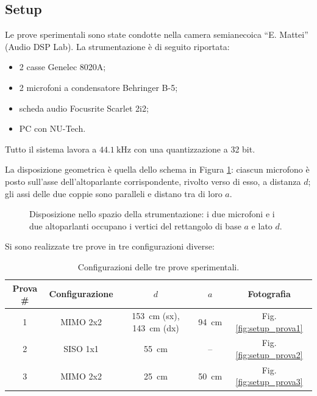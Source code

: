 \documentclass[11pt,a4paper]{article}
\begin{document}
	\subsection{Setup}
	Le prove sperimentali sono state condotte nella camera semianecoica “E. Mattei” (Audio DSP Lab). 
	La strumentazione è di seguito riportata:
	\begin{itemize}
		\item 2 casse Genelec 8020A;
		\item  2 microfoni a condensatore Behringer B-5;
		\item scheda audio Focusrite Scarlet 2i2;
		\item PC con NU-Tech.
	\end{itemize}
	
	Tutto il sistema lavora a $\SI{44.1}{\kilo\hertz}$ con una quantizzazione a 32 bit.
	
	La disposizione geometrica è quella dello schema in Figura \ref{fig:setup_misure}: ciascun microfono è posto sull'asse dell'altoparlante corrispondente, rivolto verso di esso, a distanza $d$; gli assi delle due coppie sono paralleli e distano tra di loro $a$.
	
	\begin{figure}[H]
		\centering
		
		\caption{Disposizione nello spazio della strumentazione: i due microfoni e i due altoparlanti occupano i vertici del rettangolo di base $a$ e lato $d$.}
		\label{fig:setup_misure}
	\end{figure}
	
	Si sono realizzate tre prove in tre configurazioni diverse:
	\begin{table}[H]
		\centering
		\renewcommand{\arraystretch}{1.5}
		\setlength{\tabcolsep}{10pt}
		\begin{tabular}{|c|c|c|c|c|}
			\hline
			Prova \# & Configurazione & $d$ & $a$ & Fotografia \\
			\hline
			1 & MIMO 2x2 & \SI{153}{\centi\meter} (sx), \SI{143}{\centi\meter} (dx) & \SI{94}{\centi\meter} & Fig. \ref{fig:setup_prova1} \\
			\hline
			2 & SISO 1x1 & \SI{55}{\centi\meter} & -- & Fig. \ref{fig:setup_prova2} \\
			\hline
			3 & MIMO 2x2 & \SI{25}{\centi\meter} & \SI{50}{\centi\meter} & Fig. \ref{fig:setup_prova3} \\
			\hline
		\end{tabular}
		\caption{Configurazioni delle tre prove sperimentali.}
		\label{tab:prove_lab}
	\end{table}
	
\end{document}
